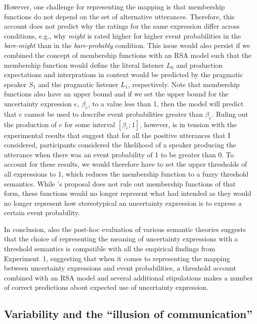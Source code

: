 However, one challenge for representing the mapping is that membership functions do not depend on the set of alternative utterances. Therefore,
this account does not predict why the ratings for the same expression differ across conditions, e.g., why \textit{might} is rated higher for higher event probabilities in
the \textit{bare-might} than in the \textit{bare-probably} condition. This issue would also persist if we combined the concept of membership functions with an RSA model such that the
membership function would define the literal listener $L_0$ and production expectations and interprations in context would be predicted by the 
pragmatic speaker $S_1$ and the pragmatic listener $L_1$, respectively. Note that membership functions also have an upper bound and if we set the upper bound for 
the uncertainty expression $e$, $\beta_e$, to a value less than 1, then the model will predict that $e$ cannot be used to describe event probabilities greater than $\beta_e$.
Ruling out the production of $e$ for some interval $[\beta_e; 1]$, however, is in tension with the experimental results that suggest that for all the positive utterances that I considered, 
participants considered the likelihood of a speaker producing the utterance when there was an event probability of 1 to be greater than 0. To account for these results, we would therefore 
have to set the upper thresholds of all expressions to 1, which reduces the membership function to a fuzzy threshold semantics. While \cite{Wallsten1986}'s 
proposal does not rule out membership functions of that form, these functions would no longer represent what \cite{Wallsten1986} had intended as they would
no longer represent how stereotypical an uncertainty expression is to express a certain event probability.

\vspace{1em}

\noindent In conclusion, also the post-hoc evaluation of various semantic theories suggests that the choice of representing the meaning of uncertainty expressions
with a threshold semantics is compatible with all the empirical findings from Experiment~1, suggesting that when it comes to representing the mapping
between uncertainty expressions and event probabilities, a threshold account combined with an RSA model and several additional stipulations
 makes a number of correct predictions about expected use of uncertainty expression.

\subsection{Variability and the ``illusion of communication''} 

